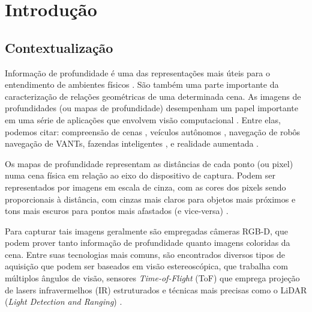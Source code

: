 
\chapter{Introdução}

\section{Contextualização}

Informação de profundidade é uma das representações mais úteis para o entendimento de ambientes físicos \cite{lasinger2019towards} \cite{zhou2019does}. São também uma parte importante da caracterização de relações geométricas de uma determinada cena. As imagens de profundidades (ou mapas de profundidade) desempenham um papel importante em uma série de aplicações que envolvem visão computacional \cite{eigen2014depth}.  Entre elas, podemos citar: compreensão de cenas \cite{jaritz2018sparse}, veículos autônomos \cite{song2021self}, navegação de robôs \cite{ma2019sparse} navegação de VANTs, \cite{padhy2023monocular} fazendas inteligentes \cite{farkhani2019sparse}, e realidade aumentada \cite{du2020depthlab}. 


Os mapas de profundidade representam as distâncias de cada ponto (ou pixel) numa cena física em relação ao eixo do dispositivo de captura. Podem ser representados por imagens em escala de cinza, com as cores dos pixels sendo proporcionais à distância, com cinzas mais claros para objetos mais próximos e tons mais escuros para pontos mais afastados (e vice-versa) \cite{dourado2020multi}.



Para capturar tais imagens geralmente são empregadas câmeras RGB-D, que podem prover tanto informação de profundidade quanto imagens coloridas da cena. Entre suas tecnologias mais comuns, são encontrados diversos tipos de aquisição que podem ser baseados em visão estereoscópica, que trabalha com múltiplos ângulos de visão, sensores \textit{Time-of-Flight} (ToF) que emprega projeção de lasers infravermelhos (IR) estruturados e técnicas mais precisas como o LiDAR (\textit{Light Detection and Ranging}) \cite{castellano2023performance}.




